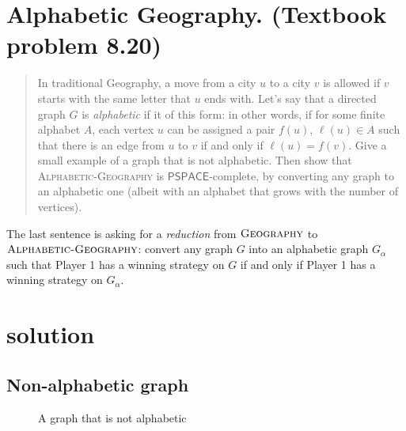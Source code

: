 

\maketitle
\thispagestyle{firststyle}
\vspace{-2.0cm}

\section{Alphabetic Geography. (Textbook problem 8.20)}
\begin{quote}
    In traditional Geography, a move from a city $u$ to a city $v$ is allowed if $v$ starts with the same letter that $u$ ends with.
    Let’s say that a directed graph $G$ is \emph{alphabetic} if it of this form:
    in other words, if for some finite alphabet $A$,
    each vertex $u$ can be assigned a pair $f(u)$, $\ell(u) \in A$
    such that there is an edge from $u$ to $v$
    if and only if $\ell(u) = f(v)$.
    Give a small example of a graph that is not alphabetic.
    Then show that \textsc{Alphabetic-Geography} is $\mathsf{PSPACE}$-complete,
    by converting any graph to an alphabetic one
    (albeit with an alphabet that grows with the number of vertices).
\end{quote}
The last sentence is asking for a \emph{reduction} from $\textsc{Geography}$ to $\textsc{Alphabetic-Geography}$:
convert any graph $G$ into an alphabetic graph $G_\alpha$ such that
Player 1 has a winning strategy on $G$
if and only if
Player 1 has a winning strategy on $G_\alpha$.

\section{solution}
\subsection*{Non-alphabetic graph}

\begin{figure}[h]
    \centering
    \caption{A graph that is not alphabetic}
\end{figure}

